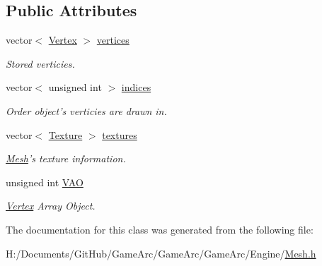 \subsection*{Public Attributes}
\begin{DoxyCompactItemize}
\item 
\hypertarget{class_mesh_abe5c05c224e47ba1e8b6393759798a9b}{vector$<$ \hyperlink{struct_vertex}{Vertex} $>$ \hyperlink{class_mesh_abe5c05c224e47ba1e8b6393759798a9b}{vertices}}\label{class_mesh_abe5c05c224e47ba1e8b6393759798a9b}

\begin{DoxyCompactList}\small\item\em Stored verticies. \end{DoxyCompactList}\item 
\hypertarget{class_mesh_a464d9a1d7e7a4f67321dffc1e8b44b7d}{vector$<$ unsigned int $>$ \hyperlink{class_mesh_a464d9a1d7e7a4f67321dffc1e8b44b7d}{indices}}\label{class_mesh_a464d9a1d7e7a4f67321dffc1e8b44b7d}

\begin{DoxyCompactList}\small\item\em Order object's verticies are drawn in. \end{DoxyCompactList}\item 
\hypertarget{class_mesh_a09bf4e8307bf7717c56501ca6293c6c0}{vector$<$ \hyperlink{struct_texture}{Texture} $>$ \hyperlink{class_mesh_a09bf4e8307bf7717c56501ca6293c6c0}{textures}}\label{class_mesh_a09bf4e8307bf7717c56501ca6293c6c0}

\begin{DoxyCompactList}\small\item\em \hyperlink{class_mesh}{Mesh}'s texture information. \end{DoxyCompactList}\item 
\hypertarget{class_mesh_a79afa055e485fb65b1a7aa5b8eda2940}{unsigned int \hyperlink{class_mesh_a79afa055e485fb65b1a7aa5b8eda2940}{V\+A\+O}}\label{class_mesh_a79afa055e485fb65b1a7aa5b8eda2940}

\begin{DoxyCompactList}\small\item\em \hyperlink{struct_vertex}{Vertex} Array Object. \end{DoxyCompactList}\end{DoxyCompactItemize}


The documentation for this class was generated from the following file\+:\begin{DoxyCompactItemize}
\item 
H\+:/\+Documents/\+Git\+Hub/\+Game\+Arc/\+Game\+Arc/\+Game\+Arc/\+Engine/\hyperlink{_mesh_8h}{Mesh.\+h}\end{DoxyCompactItemize}
